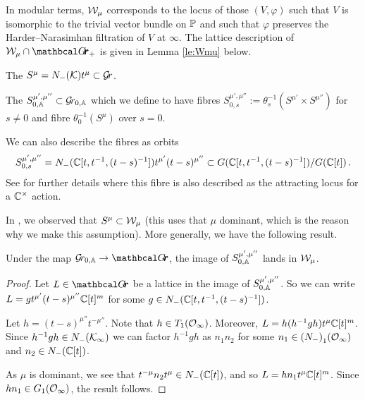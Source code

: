 \documentclass{article}
\begin{document}
In modular terms, $\cW_\mu$ corresponds to the locus of those $ (V, \varphi)$ such that $ V $ is isomorphic to the trivial vector bundle on $ \PP$ and such that $ \varphi$ preserves the {Harder--Narasimhan filtration of $V$ at $ \infty$}. The lattice description of $ \cW_\mu \cap \Grth_+$ is given in Lemma \ref{le:Wmu} below. 
% 
\begin{definition} 
\label{def:inftyorbit}
    The  $ S^\mu = N_-(\cK)t^\mu \subset \Gr $.
\end{definition}
% 
\begin{definition} 
\label{def:inftyorbitfam}
    The  $S^{\mu', \mu''}_{0,\AA} \subset \Grbd$ which we define to have fibres $ S^{\mu', \mu''}_{0,s} := \theta_s^{-1}( S^{\mu'}\times S^{\mu''}) $ for $ s \ne 0$ and fibre $ \theta_0^{-1}(S^{\mu})$ over $ s = 0 $.
\end{definition}
% 
We can also describe the fibres as orbits
$$
    S^{\mu', \mu''}_{0,s} = 
    N_-(\CC[t, t^{-1}, (t-s)^{-1}])t^{\mu'} (t-s)^{\mu''} \subset G(\CC[t,t^{-1}, (t-s)^{-1}]) / G(\CC[t]) \,. 
$$
See \cite[Section~5.2]{baumann2020bases} for further details where this fibre is also described as the attracting locus for a $\Cx$ action.

In \cite[Prop~2.6]{kamnitzer2014yangians}, we observed that $ S^\mu \subset \cW_\mu$ (this uses that $\mu$ dominant, which is the reason why we make this assumption).  More generally, we have the following result.

\begin{lemma}
\label{le:inftyfusiskl} 
    Under the map $ \Grbd \rightarrow \Grth$, the image of $ S^{\mu', \mu''}_{0,\AA}$ lands in $ \cW_\mu$.
\end{lemma}
% 
\begin{proof}
    Let $ L \in\Grth$ be a lattice in the image of $S^{\mu',\mu''}_{0,\AA}$. So we can write $ L = g t^{\mu'} (t-s)^{\mu''}\CC[t]^m$ for some $ g \in N_-(\CC[t, t^{-1}, (t-s)^{-1}]) $. 
    
    Let $ h =(t-s)^{\mu''} t^{-\mu''}  $.  Note that $ h \in T_1(\Oinf)$. 
    Moreover, $L = h (h^{-1} g h) t^{\mu}\CC[t]^m$. 
    Since $h^{-1} g h \in N_-(\cK_\infty)$ we can factor $ h^{-1} g h$ as $n_1 n_2$ for some $ n_1 \in {(N_-)}_1(\Oinf)$ and $n_2 \in {N_-}(\CC[t]) $. 
    
    As $ \mu $ is dominant, we see that $ t^{-\mu} n_2 t^\mu \in N_-(\CC[t]) $, and so $ L = h n_1 t^\mu \CC[t]^m$.  Since $ hn_1 \in G_1(\Oinf)$, the result follows. 
\end{proof}
% 
\end{document}
